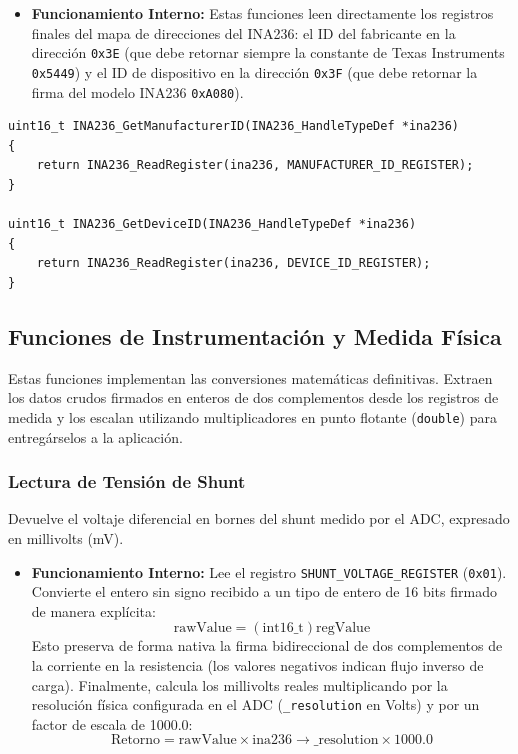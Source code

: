 \documentclass[
10pt, %
a4paper, %
oneside, %
headinclude,footinclude, %
BCOR5mm, %
]{scrartcl}
\begin{document}
\begin{itemize}
	\item \textbf{Funcionamiento Interno:}
		Estas funciones leen directamente los registros finales del mapa de direcciones del INA236: el ID del fabricante en la dirección \texttt{0x3E} (que debe retornar siempre la constante de Texas Instruments \texttt{0x5449}) y el ID de dispositivo en la dirección \texttt{0x3F} (que debe retornar la firma del modelo INA236 \texttt{0xA080}).
\end{itemize}

\begin{lstlisting}[style=CMakeStyle]
uint16_t INA236_GetManufacturerID(INA236_HandleTypeDef *ina236)
{
    return INA236_ReadRegister(ina236, MANUFACTURER_ID_REGISTER);
}

uint16_t INA236_GetDeviceID(INA236_HandleTypeDef *ina236)
{
    return INA236_ReadRegister(ina236, DEVICE_ID_REGISTER);
}
\end{lstlisting}

\subsection{Funciones de Instrumentación y Medida Física}
Estas funciones implementan las conversiones matemáticas definitivas. Extraen los datos crudos firmados en enteros de dos complementos desde los registros de medida y los escalan utilizando multiplicadores en punto flotante (\texttt{double}) para entregárselos a la aplicación.

\subsubsection{Lectura de Tensión de Shunt}
Devuelve el voltaje diferencial en bornes del shunt medido por el ADC, expresado en millivolts (mV).

\begin{itemize}
	\item \textbf{Funcionamiento Interno:}
		Lee el registro \texttt{SHUNT\_VOLTAGE\_REGISTER} (\texttt{0x01}). Convierte el entero sin signo recibido a un tipo de entero de 16 bits firmado de manera explícita:
		\begin{equation}
			\text{rawValue} = (\text{int16\_t})\text{regValue}
		\end{equation}
		Esto preserva de forma nativa la firma bidireccional de dos complementos de la corriente en la resistencia (los valores negativos indican flujo inverso de carga). Finalmente, calcula los millivolts reales multiplicando por la resolución física configurada en el ADC (\texttt{\_resolution} en Volts) y por un factor de escala de 1000.0:
		\begin{equation}
			\text{Retorno} = \text{rawValue} \times \text{ina236}\rightarrow\text{\_resolution} \times 1000.0
		\end{equation}
\end{itemize}
\end{document}
